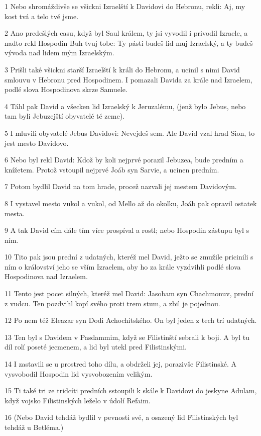 \par 1 Nebo shromáždivše se všickni Izraelští k Davidovi do Hebronu, rekli: Aj, my kost tvá a telo tvé jsme.
\par 2 Ano predešlých casu, když byl Saul králem, ty jsi vyvodil i privodil Izraele, a nadto rekl Hospodin Buh tvuj tobe: Ty pásti budeš lid muj Izraelský, a ty budeš vývoda nad lidem mým Izraelským.
\par 3 Prišli také všickni starší Izraelští k králi do Hebronu, a ucinil s nimi David smlouvu v Hebronu pred Hospodinem. I pomazali Davida za krále nad Izraelem, podlé slova Hospodinova skrze Samuele.
\par 4 Táhl pak David a všecken lid Izraelský k Jeruzalému, (jenž bylo Jebus, nebo tam byli Jebuzejští obyvatelé té zeme).
\par 5 I mluvili obyvatelé Jebus Davidovi: Nevejdeš sem. Ale David vzal hrad Sion, to jest mesto Davidovo.
\par 6 Nebo byl rekl David: Kdož by koli nejprvé porazil Jebuzea, bude predním a knížetem. Protož vstoupil nejprvé Joáb syn Sarvie, a ucinen predním.
\par 7 Potom bydlil David na tom hrade, procež nazvali jej mestem Davidovým.
\par 8 I vystavel mesto vukol a vukol, od Mello až do okolku, Joáb pak opravil ostatek mesta.
\par 9 A tak David cím dále tím více prospíval a rostl; nebo Hospodin zástupu byl s ním.
\par 10 Tito pak jsou prední z udatných, kteréž mel David, ježto se zmužile pricinili s ním o království jeho se vším Izraelem, aby ho za krále vyzdvihli podlé slova Hospodinova nad Izraelem.
\par 11 Tento jest pocet silných, kteréž mel David: Jasobam syn Chachmonuv, prední z vudcu. Ten pozdvihl kopí svého proti trem stum, a zbil je pojednou.
\par 12 Po nem též Eleazar syn Dodi Achochitského. On byl jeden z tech trí udatných.
\par 13 Ten byl s Davidem v Pasdammim, když se Filistinští sebrali k boji. A byl tu díl rolí poseté jecmenem, a lid byl utekl pred Filistinskými.
\par 14 I zastavili se u prostred toho dílu, a obdrželi jej, porazivše Filistinské. A vysvobodil Hospodin lid vysvobozením velikým.
\par 15 Ti také tri ze tridcíti predních sstoupili k skále k Davidovi do jeskyne Adulam, když vojsko Filistinských leželo v údolí Refaim.
\par 16 (Nebo David tehdáž bydlil v pevnosti své, a osazený lid Filistinských byl tehdáž u Betléma.)

